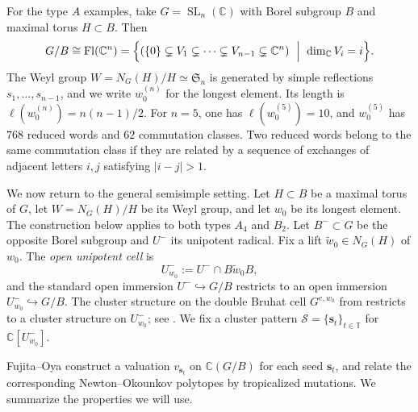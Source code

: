 \documentclass[10pt]{amsart}
\numberwithin{equation}{section}
\DeclareMathOperator{\SL}{SL}
\newcommand{\C}{{\mathbb{C}}}
\DeclareMathOperator{\flag}{Fl}
\theoremstyle{plain}
\theoremstyle{definition}
\theoremstyle{remark}
\begin{document}
For the type $A$ examples, take $G=\SL_n(\C)$ with
Borel subgroup $B$ and maximal torus $H\subset B$.
Then
\[
G/B \cong \flag(\C^n)
=\Bigl\{(\{0\}\subsetneq V_1\subsetneq \cdots \subsetneq V_{n-1}\subsetneq \C^n)\ \Bigm|\ \dim_\C V_i=i\Bigr\}.
\]
The Weyl group $W=N_G(H)/H\simeq \mathfrak S_n$ is generated by simple reflections $s_1,\dots,s_{n-1}$, and we write $w_0^{(n)}$ for the longest element.
Its length is $\ell(w_0^{(n)})=n(n-1)/2$.
For $n=5$, one has $\ell(w_0^{(5)})=10$, and $w_0^{(5)}$ has $768$ reduced words and $62$ commutation classes. 
Two reduced words belong to the same commutation class if they
are related by a sequence of exchanges of adjacent letters
$i,j$ satisfying $|i-j|>1$. 

We now return to the general semisimple setting.
Let $H\subset B$ be a maximal torus of $G$, let
$W=N_G(H)/H$ be its Weyl group, and let $w_0$ be its
longest element. The construction below applies to
both types $A_4$ and $B_2$.
Let $B^-\subset G$ be the opposite Borel subgroup and $U^-$ its unipotent radical.
Fix a lift $\widetilde w_0\in N_G(H)$ of $w_0$.
The \emph{open unipotent cell} is
\[
U^-_{w_0}:=U^-\cap B\widetilde w_0 B,
\]
and the standard open immersion $U^-\hookrightarrow G/B$ restricts to an open immersion $U^-_{w_0}\hookrightarrow G/B$.
The cluster structure on the double Bruhat cell $G^{e,w_0}$ from \cite{BFZ05} restricts to a cluster structure on $U^-_{w_0}$; see \cite[Appendix~B]{FujitaOya}.
We fix a cluster pattern $\mathcal S=\{{\bm s}_t\}_{t\in\mathbb T}$ for $\C[U^-_{w_0}]$.

Fujita--Oya \cite{FujitaOya} construct a valuation $v_{{\bm s}_t}$ on $\C(G/B)$ for each seed ${\bm s}_t$, and relate the corresponding Newton--Okounkov polytopes by tropicalized mutations.
We summarize the properties we will use.
\end{document}
